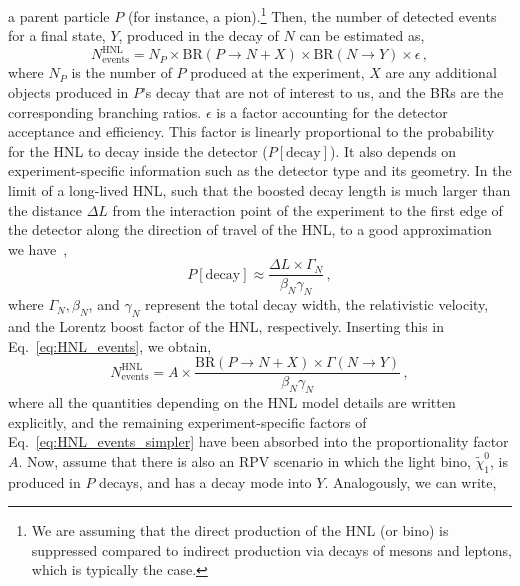 \begin{itemize}
    a parent particle $P$ (for instance, a pion).\footnote{We are assuming that the direct production of 
    the HNL (or bino) is suppressed compared to indirect production via decays of mesons and leptons, which is 
    typically the case.} Then, the number of detected events for a final state, $Y$, produced in the decay of $N$ can be estimated as,
    \begin{equation}
        N^{\text{HNL}}_{\text{events}} = N_P\times \text{BR}(P\to N+X) \times \text{BR}(N\to Y) \times \epsilon\,,
        \label{eq:HNL_events}
    \end{equation}
    where $N_P$ is the number of $P$ produced at the experiment, $X$ are any additional objects produced in 
    $P$'s decay that are not of interest to us, and the BRs are the corresponding branching ratios. $\epsilon$ is a factor accounting for the detector acceptance and efficiency. This 
    factor is linearly proportional to the probability for the HNL to decay inside the detector ($P[
    \text{decay}]$). It also depends on experiment-specific information such as the detector type and its geometry.
    In the limit of a long-lived HNL, such that the boosted decay length is much 
    larger than the distance $\Delta L$ from the interaction point of the experiment to the first edge of the 
    detector along the direction of travel of the HNL, to a good approximation we have~\cite{Beltran:2023nli},
    \begin{equation}
        P[\text{decay}] \approx \frac{\Delta L \times \Gamma_N}{\beta_N\gamma_N}\,,
    \end{equation}
    where $\Gamma_N, \beta_N$, and $\gamma_N$ represent the total decay width, the relativistic velocity, 
    and the Lorentz boost factor of the HNL, respectively. Inserting this in Eq.~\eqref{eq:HNL_events}, 
    we obtain,
    \begin{equation}
        N^{\text{HNL}}_{\text{events}} = A\times\frac{\text{BR}(P\to N+X) \times \Gamma(N\to Y)}{\beta_N\gamma_N}\,,
        \label{eq:HNL_events_simpler}
    \end{equation}
    where all the quantities depending on the HNL model details are written explicitly, and the remaining 
    experiment-specific factors of Eq.~\eqref{eq:HNL_events_simpler} have been absorbed into the 
    proportionality factor $A$. Now, assume that there is also an RPV scenario in which the light bino, $\tilde
    {\chi}^0_1$, is produced in $P$ decays, and has a decay mode into $Y$. Analogously, we can 
    write,
    \begin{equation}

\end{equation}
\end{itemize}
